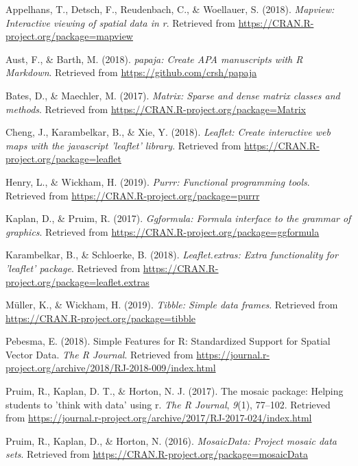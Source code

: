 \documentclass[man]{apa6}
\begin{document}
\begingroup
\setlength{\parindent}{-0.5in} \setlength{\leftskip}{0.5in}

\hypertarget{refs}{}
\hypertarget{ref-R-mapview}{}
Appelhans, T., Detsch, F., Reudenbach, C., \& Woellauer, S. (2018).
\emph{Mapview: Interactive viewing of spatial data in r}. Retrieved from
\url{https://CRAN.R-project.org/package=mapview}

\hypertarget{ref-R-papaja}{}
Aust, F., \& Barth, M. (2018). \emph{papaja: Create APA manuscripts with
R Markdown}. Retrieved from \url{https://github.com/crsh/papaja}

\hypertarget{ref-R-Matrix}{}
Bates, D., \& Maechler, M. (2017). \emph{Matrix: Sparse and dense matrix
classes and methods}. Retrieved from
\url{https://CRAN.R-project.org/package=Matrix}

\hypertarget{ref-R-leaflet}{}
Cheng, J., Karambelkar, B., \& Xie, Y. (2018). \emph{Leaflet: Create
interactive web maps with the javascript 'leaflet' library}. Retrieved
from \url{https://CRAN.R-project.org/package=leaflet}

\hypertarget{ref-R-purrr}{}
Henry, L., \& Wickham, H. (2019). \emph{Purrr: Functional programming
tools}. Retrieved from \url{https://CRAN.R-project.org/package=purrr}

\hypertarget{ref-R-ggformula}{}
Kaplan, D., \& Pruim, R. (2017). \emph{Ggformula: Formula interface to
the grammar of graphics}. Retrieved from
\url{https://CRAN.R-project.org/package=ggformula}

\hypertarget{ref-R-leaflet.extras}{}
Karambelkar, B., \& Schloerke, B. (2018). \emph{Leaflet.extras: Extra
functionality for 'leaflet' package}. Retrieved from
\url{https://CRAN.R-project.org/package=leaflet.extras}

\hypertarget{ref-R-tibble}{}
Müller, K., \& Wickham, H. (2019). \emph{Tibble: Simple data frames}.
Retrieved from \url{https://CRAN.R-project.org/package=tibble}

\hypertarget{ref-R-sf}{}
Pebesma, E. (2018). Simple Features for R: Standardized Support for
Spatial Vector Data. \emph{The R Journal}. Retrieved from
\url{https://journal.r-project.org/archive/2018/RJ-2018-009/index.html}

\hypertarget{ref-R-mosaic}{}
Pruim, R., Kaplan, D. T., \& Horton, N. J. (2017). The mosaic package:
Helping students to 'think with data' using r. \emph{The R Journal},
\emph{9}(1), 77--102. Retrieved from
\url{https://journal.r-project.org/archive/2017/RJ-2017-024/index.html}

\hypertarget{ref-R-mosaicData}{}
Pruim, R., Kaplan, D., \& Horton, N. (2016). \emph{MosaicData: Project
mosaic data sets}. Retrieved from
\url{https://CRAN.R-project.org/package=mosaicData}
\end{document}
